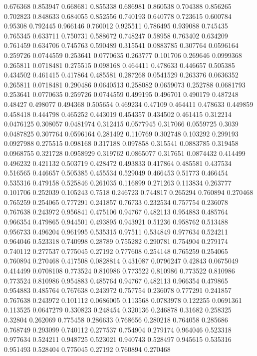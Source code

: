 0.676368 0.853947
0.668681 0.855338
0.686981 0.860538
0.704388 0.856265
0.702823 0.848633
0.684055 0.852556
0.740193 0.640778
0.723615 0.600784
0.95308 0.792445
0.966146 0.760012
0.925511 0.786495
0.939088 0.745435
0.765345 0.633711
0.750731 0.588672
0.748247 0.58958
0.763402 0.634209
0.761459 0.634706
0.745763 0.590489
0.315541 0.0883785
0.307764 0.0596164
0.259726 0.0744559
0.253641 0.0770635
0.263777 0.101706
0.269646 0.0999368
0.265811 0.0718481
0.275515 0.098168
0.464411 0.478633
0.446657 0.505385
0.434502 0.461415
0.417864 0.485581
0.287268 0.0541529
0.263376 0.0636352
0.265811 0.0718481
0.290486 0.0640513
0.258082 0.0659073
0.252788 0.0681793
0.253641 0.0770635
0.259726 0.0744559
0.499195 0.496701
0.490179 0.487248
0.48427 0.498077
0.494368 0.505654
0.469234 0.47109
0.464411 0.478633
0.449859 0.458418
0.444798 0.465252
0.443019 0.454357
0.434502 0.461415
0.312214 0.0476125
0.308057 0.0481974
0.312415 0.0577945
0.317066 0.0559725
0.3039 0.0487825
0.307764 0.0596164
0.281492 0.110769
0.302748 0.103292
0.299193 0.0927988
0.275515 0.098168
0.317188 0.097858
0.315541 0.0883785
0.319458 0.0968755
0.321728 0.0958929
0.319762 0.0865077
0.317651 0.0874432
0.414499 0.496232
0.421132 0.503719
0.428472 0.493833
0.417864 0.485581
0.437534 0.516565
0.446657 0.505385
0.455534 0.529049
0.466453 0.51773
0.466454 0.535316
0.479158 0.525846
0.261035 0.116899
0.271263 0.113834
0.263777 0.101706
0.252039 0.105243
0.7518 0.246723
0.744817 0.265294
0.760894 0.270468
0.765259 0.254065
0.777291 0.241857
0.76733 0.232534
0.757754 0.236078
0.767638 0.243972
0.956841 0.475106
0.94767 0.482113
0.954883 0.485764
0.966354 0.479865
0.944501 0.493895
0.943921 0.51236
0.958762 0.513488
0.956733 0.496204
0.961995 0.535315
0.97511 0.534849
0.977634 0.524211
0.964046 0.523318
0.740998 0.28789
0.755282 0.290781
0.754904 0.279174
0.740112 0.277537
0.775045 0.27192
0.777608 0.254148
0.765259 0.254065
0.760894 0.270468
0.417508 0.0828814
0.431087 0.0796247
0.42843 0.0675049
0.414499 0.0708108
0.773524 0.810986
0.773522 0.810986
0.773522 0.810986
0.773524 0.810986
0.954883 0.485764
0.94767 0.482113
0.966354 0.479865
0.954883 0.485764
0.767638 0.243972
0.757754 0.236078
0.777291 0.241857
0.767638 0.243972
0.101112 0.0686005
0.113568 0.0783978
0.122255 0.0691361
0.113525 0.0647279
0.330823 0.248454
0.320136 0.246878
0.31682 0.258325
0.32804 0.262069
0.775458 0.286633
0.768656 0.280218
0.764058 0.285686
0.768749 0.293099
0.740112 0.277537
0.754904 0.279174
0.964046 0.523318
0.977634 0.524211
0.948725 0.523021
0.940743 0.528497
0.945615 0.535316
0.951493 0.528404
0.775045 0.27192
0.760894 0.270468
